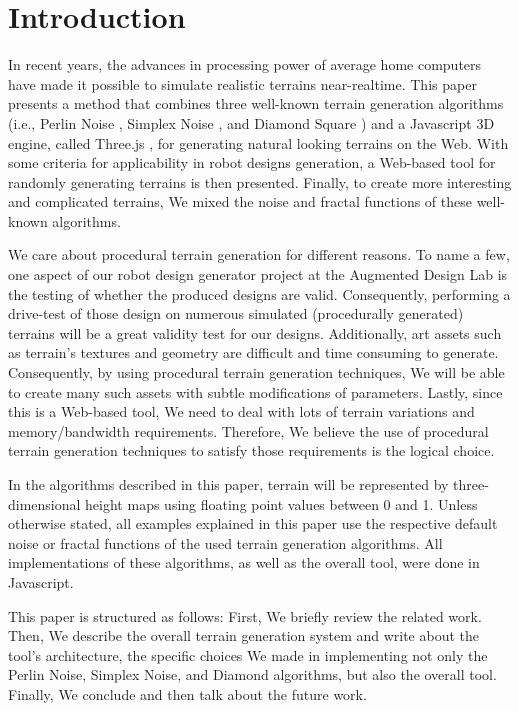 \section{Introduction} %
\label{sec:introduction}

In recent years, the advances in processing power of average home computers have made it possible to simulate realistic terrains near-realtime. This paper presents a method that combines three well-known terrain generation algorithms (i.e., Perlin Noise  \cite{perlin:2002}, Simplex Noise \cite{perlin:2001}, and Diamond Square \cite{fournier:1982}) and a Javascript 3D engine, called Three.js \cite{threeJS}, for generating natural looking terrains on the Web. With some criteria for applicability in robot designs generation, a Web-based tool for randomly generating terrains is then presented. Finally, to create more interesting and complicated terrains, We mixed the noise and fractal functions of these well-known algorithms.     

We care about procedural terrain generation for different reasons. To name a few, one aspect of our robot design generator project at the Augmented Design Lab is the testing of whether the produced designs are valid. Consequently, performing a drive-test of those design on numerous simulated (procedurally generated) terrains will be a great validity test for our designs. Additionally, art assets such as terrain's textures and geometry are difficult and time consuming to generate. Consequently, by using procedural terrain generation techniques, We will be able to create many such assets with subtle modifications of parameters. Lastly, since this is a Web-based tool, We need to deal with lots of terrain variations and memory/bandwidth requirements. Therefore, We believe the use of procedural terrain generation techniques to satisfy those requirements is the logical choice.    

In the algorithms described in this paper, terrain will be represented by three-dimensional height maps using floating point values between 0 and 1. Unless otherwise stated, all examples explained in this paper use the respective default noise or fractal functions of the used terrain generation algorithms. All implementations of these algorithms, as well as the overall tool, were done in Javascript.  

This paper is structured as follows: First, We briefly review the related work. Then, We describe the overall terrain generation system and write about the tool's architecture, the specific choices We made in implementing not only the Perlin Noise, Simplex Noise, and Diamond algorithms, but also the overall tool. Finally, We conclude and then talk about the future work.  

